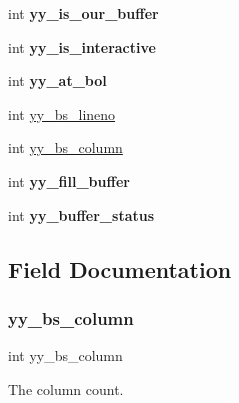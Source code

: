 \begin{DoxyCompactItemize}
int {\bfseries yy\+\_\+is\+\_\+our\+\_\+buffer}
\item 
\mbox{\label{structyy__buffer__state_a2a823a361fbbe1af51a957d0d0cbf4e2}} 
int {\bfseries yy\+\_\+is\+\_\+interactive}
\item 
\mbox{\label{structyy__buffer__state_a8e60af6806593faf52d1cc01148af6e3}} 
int {\bfseries yy\+\_\+at\+\_\+bol}
\item 
int \hyperlink{structyy__buffer__state_a59c414c619ca0071fe3a091336106d82}{yy\+\_\+bs\+\_\+lineno}
\item 
int \hyperlink{structyy__buffer__state_ad9867983bbc1666304d83623cd6e3dd8}{yy\+\_\+bs\+\_\+column}
\item 
\mbox{\label{structyy__buffer__state_a5e492694db97a0d7760d8cc5fd058dfd}} 
int {\bfseries yy\+\_\+fill\+\_\+buffer}
\item 
\mbox{\label{structyy__buffer__state_a6ca09e676a787676260c558a0f731285}} 
int {\bfseries yy\+\_\+buffer\+\_\+status}
\end{DoxyCompactItemize}


\subsection{Field Documentation}
\mbox{\label{structyy__buffer__state_ad9867983bbc1666304d83623cd6e3dd8}} 
\subsubsection{\texorpdfstring{yy\+\_\+bs\+\_\+column}{yy\_bs\_column}}
{\footnotesize\ttfamily int yy\+\_\+bs\+\_\+column}

The column count. \mbox{\label{structyy__buffer__state_a59c414c619ca0071fe3a091336106d82}} 
